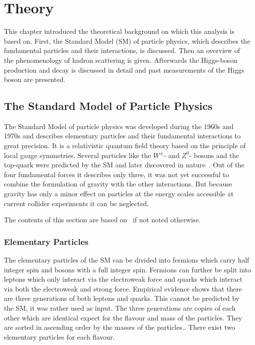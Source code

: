 \chapter{Theory}\label{cha:theory}

This chapter introduced the theoretical background on which this analysis is based on.
First, the Standard Model (SM) of particle physics, which describes the fundamental particles and their interactions, is discussed.
Then an overview of the phenomenology of hadron scattering is given.
Afterwards the Higgs-boson production and decay is discussed in detail and past measurements of the Higgs boson are presented.

\section{The Standard Model of Particle Physics}\label{sec:theory:sm}

The Standard Model of particle physics was developed during the 1960s and 1970s and
describes elementary particles and their fundamental interactions to great precision.
It is a relativistic quantum field theory based on the principle of local gauge symmetries.
Several particles like the $W^\pm$- and $Z^0$- bosons and the top-quark were predicted by the SM and later discovered in
nature~\cite{ZDiscovery,WDiscovery,TopDiscovery,ZeeDiscovery,WeDiscovery,TopDiscoveryD0}.
Out of the four fundamental forces it describes only three, it was not yet successful to combine the
formulation of gravity with the other interactions.
But because gravity has only a minor effect on particles at the energy scales accessible at current collider experiments
it can be neglected.

The contents of this section are based on~\cite{Griffiths,HalsenMartin,PeskinSchroeder} if not noted otherwise.

\subsection{Elementary Particles}\label{sub:theory:sm:particles}

The elementary particles of the SM can be divided into fermions which carry half integer spin and bosons with a full integer spin.
Fermions can further be split into leptons which only interact via the electroweak force and quarks which interact via
both the electroweak and strong force.
Empirical evidence shows that there are three generations of both leptons and quarks.
This cannot be predicted by the SM, it was rather used as input.
The three generations are copies of each other which are identical expect for the flavour and mass of the particles.
They are sorted in ascending order by the masses of the particles..
There exist two elementary particles for each flavour.

